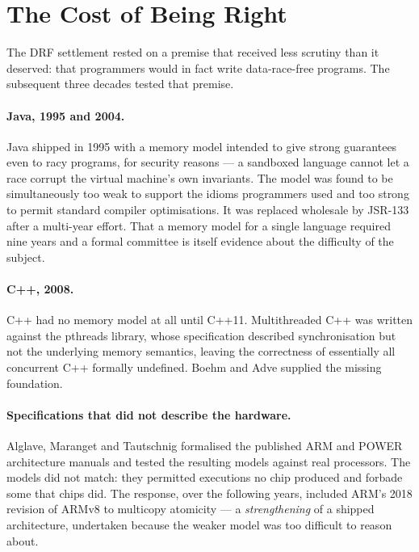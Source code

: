 \section{The Cost of Being Right}

The DRF settlement rested on a premise that received less scrutiny than it
deserved: that programmers would in fact write data-race-free programs.
The
subsequent three decades tested that premise.

\paragraph{Java, 1995 and 2004.} Java shipped in 1995 with a memory model intended
to give strong guarantees even to racy programs, for security reasons --- a
sandboxed language cannot let a race corrupt the virtual machine's own invariants.
The model was found to be simultaneously too weak to support the idioms
programmers used and too strong to permit standard compiler optimisations.
It was
replaced wholesale by JSR-133 \cite{manson2005java} after a multi-year effort.
That a memory model for a single language required nine years and a formal
committee is itself evidence about the difficulty of the subject.

\paragraph{C++, 2008.} C++ had no memory model at all until C++11. Multithreaded
C++ was written against the pthreads library, whose specification described
synchronisation but not the underlying memory semantics, leaving the correctness
of essentially all concurrent C++ formally undefined. Boehm and Adve
\cite{boehm2008foundations} supplied the missing foundation.

\paragraph{Specifications that did not describe the hardware.} Alglave, Maranget
and Tautschnig \cite{alglave2014herding} formalised the published ARM and POWER
architecture manuals and tested the resulting models against real processors.
The
models did not match: they permitted executions no chip produced and forbade some
that chips did.
The response, over the following years, included ARM's 2018
revision of ARMv8 to multicopy atomicity --- a \emph{strengthening} of a shipped
architecture, undertaken because the weaker model was too difficult to reason
about.

